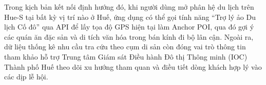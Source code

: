 Trong kịch bản kết nối định hướng đó, khi người dùng mở phân hệ du lịch trên Hue-S tại bất kỳ vị trí nào ở Huế, ứng dụng có thể gọi tính năng ``Trợ lý ảo Du lịch Cố đô'' qua API để lấy tọa độ GPS hiện tại làm Anchor POI, qua đó gợi ý các quán ăn đặc sản và di tích văn hóa trong bán kính đi bộ lân cận. Ngoài ra, dữ liệu thống kê nhu cầu tra cứu theo cụm di sản còn đóng vai trò thông tin tham khảo hỗ trợ Trung tâm Giám sát Điều hành Đô thị Thông minh (IOC) Thành phố Huế theo dõi xu hướng tham quan và điều tiết dòng khách hợp lý vào các dịp lễ hội.
